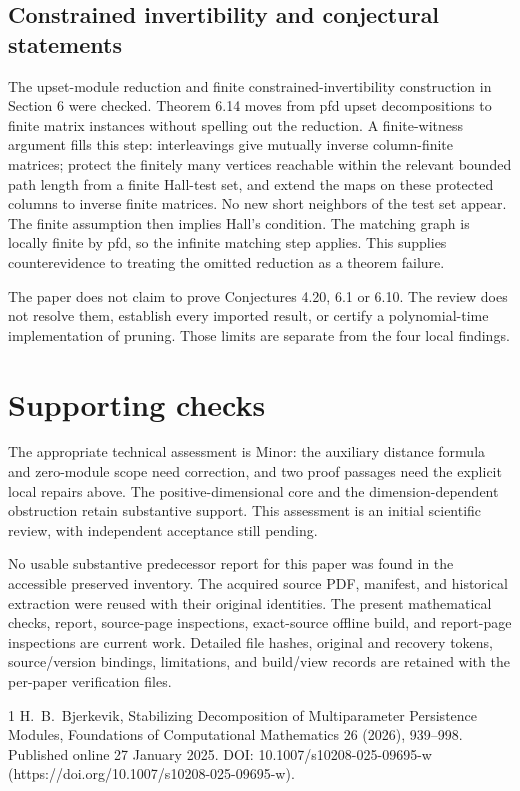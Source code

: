 \documentclass[10pt]{article}
\begin{document}
\subsection*{Constrained invertibility and conjectural statements}
The upset-module reduction and finite constrained-invertibility construction in Section 6 were checked. Theorem 6.14 moves from pfd upset decompositions to finite matrix instances without spelling out the reduction. A finite-witness argument fills this step: interleavings give mutually inverse column-finite matrices; protect the finitely many vertices reachable within the relevant bounded path length from a finite Hall-test set, and extend the maps on these protected columns to inverse finite matrices. No new short neighbors of the test set appear. The finite assumption then implies Hall’s condition. The matching graph is locally finite by pfd, so the infinite matching step applies. This supplies counterevidence to treating the omitted reduction as a theorem failure.\par
The paper does not claim to prove Conjectures 4.20, 6.1 or 6.10. The review does not resolve them, establish every imported result, or certify a polynomial-time implementation of pruning. Those limits are separate from the four local findings.\par
\section*{Supporting checks}
The appropriate technical assessment is Minor: the auxiliary distance formula and zero-module scope need correction, and two proof passages need the explicit local repairs above. The positive-dimensional core and the dimension-dependent obstruction retain substantive support. This assessment is an initial scientific review, with independent acceptance still pending.\par
No usable substantive predecessor report for this paper was found in the accessible preserved inventory. The acquired source PDF, manifest, and historical extraction were reused with their original identities. The present mathematical checks, report, source-page inspections, exact-source offline build, and report-page inspections are current work. Detailed file hashes, original and recovery tokens, source/version bindings, limitations, and build/view records are retained with the per-paper verification files.\par
1 H. B. Bjerkevik, Stabilizing Decomposition of Multiparameter Persistence Modules, Foundations of Computational Mathematics 26 (2026), 939–998. Published online 27 January 2025. DOI: 10.1007/s10208-025-09695-w (https://doi.org/10.1007/s10208-025-09695-w).\par
\end{document}
